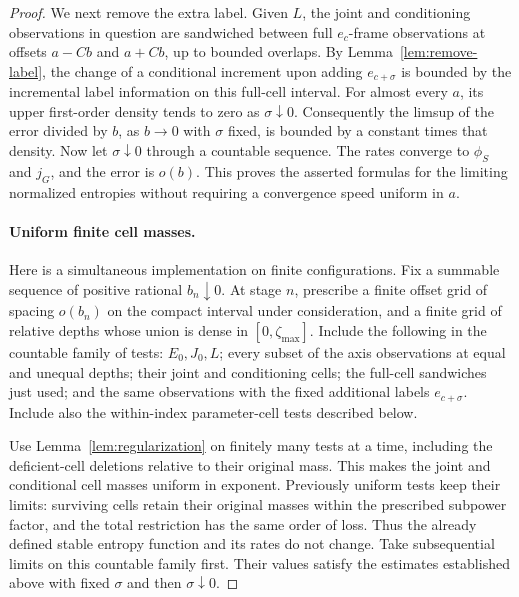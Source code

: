 \begin{proof}
We next remove the extra label. Given $L$, the joint and
conditioning observations in question are sandwiched between full
$e_c$-frame observations at offsets $a-Cb$ and $a+Cb$, up to bounded
overlaps. By Lemma~\ref{lem:remove-label}, the change of a
conditional increment upon adding $e_{c+\sigma}$ is bounded by
the incremental label information on this full-cell interval.
For almost every $a$, its upper first-order density tends to zero
as $\sigma\downarrow0$.
Consequently the limsup of the error divided by $b$, as $b\to0$
with $\sigma$ fixed, is bounded by a constant times that density.
Now let $\sigma\downarrow0$ through a countable sequence.
The rates converge to $\phi_S$ and $j_G$, and the error is $o(b)$.
This proves the asserted formulas for the limiting normalized
entropies without requiring a convergence speed uniform in $a$.

\paragraph{Uniform finite cell masses.}
Here is a simultaneous implementation on finite configurations.
Fix a summable sequence of positive rational $b_n\downarrow0$.
At stage $n$, prescribe a finite offset grid of spacing $o(b_n)$
on the compact interval under consideration, and a finite grid of
relative depths whose union is dense in
$[0,\zeta_{\max}]$. Include the following in the countable family
of tests: $E_0,J_0,L$; every subset of the axis observations at
equal and unequal depths; their joint and conditioning cells;
the full-cell sandwiches just used; and the same observations with
the fixed additional labels $e_{c+\sigma}$.
Include also the within-index parameter-cell tests described below.

Use Lemma~\ref{lem:regularization} on finitely many tests at a time,
including the deficient-cell deletions relative to their original
mass. This makes the joint and conditional cell masses uniform in
exponent. Previously uniform tests keep their limits: surviving
cells retain their original masses within the prescribed subpower
factor, and the total restriction has the same order of loss.
Thus the already defined stable entropy function and its rates do
not change.
Take subsequential limits on this countable family first.
Their values satisfy the estimates established above with fixed
$\sigma$ and then $\sigma\downarrow0$.


\end{proof}
